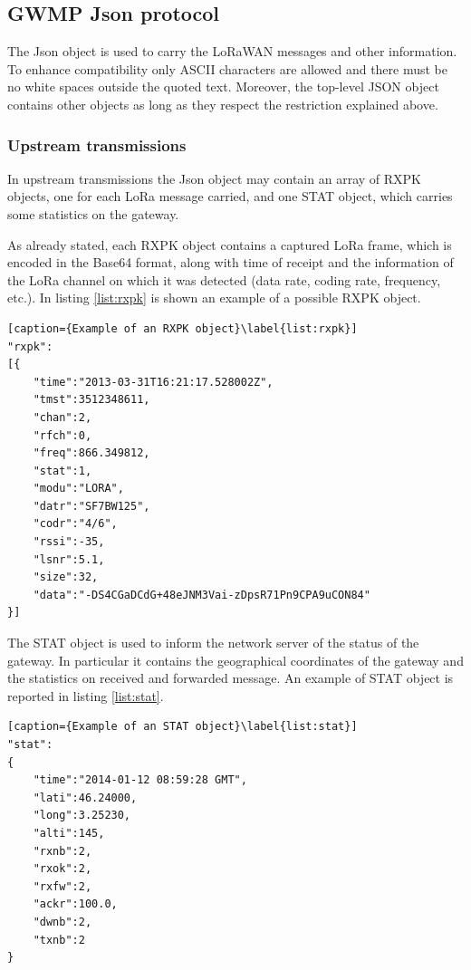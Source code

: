 \subsection{GWMP Json protocol}
The Json object is used to carry the LoRaWAN messages and other information. To enhance compatibility only ASCII characters are allowed and there must be no white spaces outside the quoted text. Moreover, the top-level JSON object contains other objects as long as they respect the restriction explained above.

\subsubsection{Upstream transmissions}
In upstream transmissions the Json object may contain an array of RXPK objects, one for each LoRa message carried, and one STAT object, which carries some statistics on the gateway.

As already stated, each RXPK object contains a captured LoRa frame, which is encoded in the Base64 format, along with time of receipt and the information of the LoRa channel on which it was detected (data rate, coding rate, frequency, etc.). In listing \ref{list:rxpk} is shown an example of a possible RXPK object.

\begin{lstlisting}[caption={Example of an RXPK object}\label{list:rxpk}]
"rxpk":
[{
	"time":"2013-03-31T16:21:17.528002Z",
	"tmst":3512348611,
	"chan":2,
	"rfch":0,
	"freq":866.349812,
	"stat":1,
	"modu":"LORA",
	"datr":"SF7BW125",
	"codr":"4/6",
	"rssi":-35,
	"lsnr":5.1,
	"size":32, 
	"data":"-DS4CGaDCdG+48eJNM3Vai-zDpsR71Pn9CPA9uCON84"
}]
\end{lstlisting}
The STAT object is used to inform the network server of the status of the gateway. In particular it contains the geographical coordinates of the gateway and the statistics on received and forwarded message. An example of STAT object is reported in listing \ref{list:stat}.

\begin{lstlisting}[caption={Example of an STAT object}\label{list:stat}]
"stat":
{
	"time":"2014-01-12 08:59:28 GMT",
	"lati":46.24000,
	"long":3.25230,
	"alti":145,
	"rxnb":2,
	"rxok":2,
	"rxfw":2,
	"ackr":100.0,
	"dwnb":2, 
	"txnb":2
}
\end{lstlisting}

